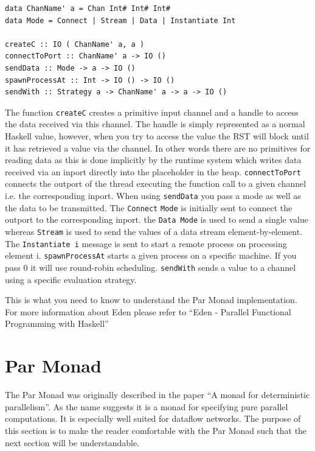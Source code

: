 \documentclass[a4paper, oneside, final]{memoir}
\begin{document}
\begin{lstlisting}
data ChanName' a = Chan Int# Int# Int#
data Mode = Connect | Stream | Data | Instantiate Int

createC :: IO ( ChanName' a, a ) 
connectToPort :: ChanName' a -> IO ()
sendData :: Mode -> a -> IO ()
spawnProcessAt :: Int -> IO () -> IO ()
sendWith :: Strategy a -> ChanName' a -> a -> IO ()
\end{lstlisting}

The function \texttt{createC} creates a primitive input channel and a
handle to access the data received via this channel. The handle is
simply represented as a normal Haskell value, however, when you try to
access the value the RST will block until it has retrieved a value via
the channel. In other words there are no primitives for reading data
as this is done implicitly by the runtime system which writes data
received via an inport directly into the placeholder in the heap.
\texttt{connectToPort} connects the outport of the thread executing
the function call to a given channel i.e. the corresponding inport.
When using \texttt{sendData} you pass a mode as well as the data to be
transmitted. The \texttt{Connect} \texttt{Mode} is initially sent to
connect the outport to the corresponding inport. the \texttt{Data
Mode} is used to send a single value whereas \texttt{Stream} is used
to send the values of a data stream element-by-element. The
\texttt{Instantiate i} message is sent to start a remote process on
processing element i.  \texttt{spawnProcessAt} starts a given process
on a specific machine.  If you pass 0 it will use round-robin
scheduling. \texttt{sendWith}  sends a value to a channel using a
specific evaluation strategy.

This is what you need to know to understand the Par Monad
implementation. For more information about Eden please refer
to ``Eden - Parallel Functional Programming with Haskell''\cite{eden}

\section{Par Monad}
\label{sec:parmonad}

The Par Monad was originally described in the paper ``A monad for deterministic parallelism''\cite{parmonad}. As the name suggests it is a monad for specifying pure parallel computations. It is especially well suited for dataflow networks. The purpose of this section is to make the reader comfortable with the Par Monad such that the next section will be understandable.
\end{document}

